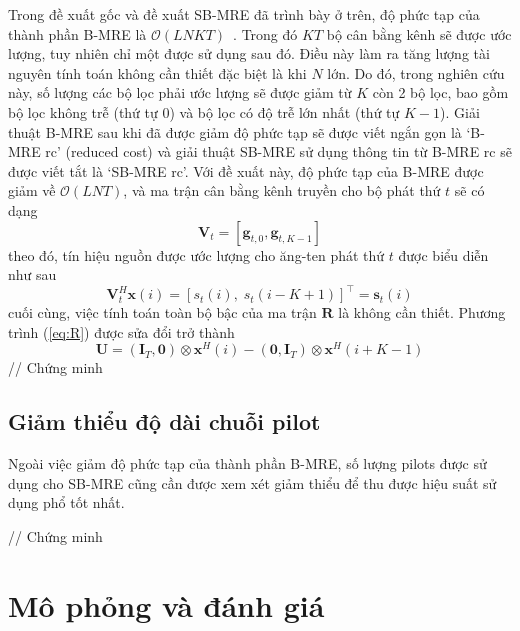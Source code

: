Trong đề xuất gốc và đề xuất SB-MRE đã trình bày ở trên, độ phức tạp của thành phần B-MRE là $\mathcal{O}(LNKT)$~\cite{original}. Trong đó $KT$ bộ cân bằng kênh sẽ được ước lượng, tuy nhiên chỉ một được sử dụng sau đó. Điều này làm ra tăng lượng tài nguyên tính toán không cần thiết đặc biệt là khi $N$ lớn. Do đó, trong nghiên cứu này, số lượng các bộ lọc phải ước lượng sẽ được giảm từ $K$ còn 2 bộ lọc, bao gồm bộ lọc không trễ (thứ tự $0$) và bộ lọc có độ trễ lớn nhất (thứ tự $K-1$). Giải thuật B-MRE sau khi đã được giảm độ phức tạp sẽ được viết ngắn gọn là `B-MRE rc' (reduced cost) và giải thuật SB-MRE sử dụng thông tin từ B-MRE rc sẽ được viết tắt là `SB-MRE rc'. Với đề xuất này, độ phức tạp của B-MRE được giảm về $\mathcal{O}(LNT)$, và ma trận cân bằng kênh truyền cho bộ phát thứ $t$ sẽ có dạng
\begin{equation}
    \mathbf{V}_{t} = [\mathbf{g}_{t, 0}, \mathbf{g}_{t, K-1}]
\end{equation}
theo đó, tín hiệu nguồn được ước lượng cho ăng-ten phát thứ $t$ được biểu diễn như sau
\begin{equation}
    \mathbf{V}_t^H \mathbf{x}(i) = [s_t(i), \; s_t(i-K+1)]^\top = \mathbf{s}_{t}(i)
\end{equation}
cuối cùng, việc tính toán toàn bộ bậc của ma trận $\mathbf{R}$ là không cần thiết. Phương trình (\ref{eq:R}) được sửa đổi trở thành
\begin{equation}
\mathbf{U} = \left(\mathbf{I}_{T}, \mathbf{0}\right) \otimes \mathbf{x}^{H}(i)-\left(\mathbf{0}, \mathbf{I}_{T}\right) \otimes \mathbf{x}^{H}(i+K-1)
\end{equation}
// Chứng minh
\subsection{Giảm thiểu độ dài chuỗi pilot}

Ngoài việc giảm độ phức tạp của thành phần B-MRE, số lượng pilots được sử dụng cho SB-MRE cũng cần được xem xét giảm thiểu để thu được hiệu suất sử dụng phổ tốt nhất. 

\noindent// Chứng minh

\section{Mô phỏng và đánh giá}

